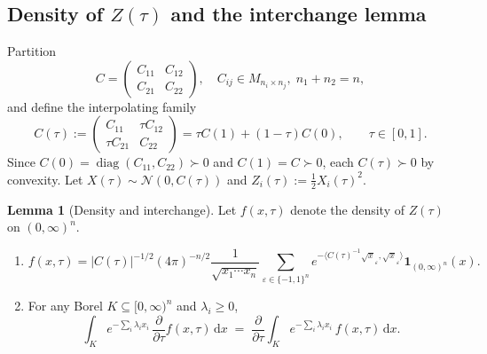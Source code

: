 \documentclass[14pt]{extarticle}
\theoremstyle{definition}
\newtheorem{lemma}[theorem]{Lemma}
\newcommand{\diag}{\operatorname{diag}}
\newcommand{\dd}{\mathrm{d}}
\newcommand{\ind}{\mathbf{1}}
\newcommand{\caln}{\mathcal{N}}
\begin{document}
\subsection{Density of $Z(\tau)$ and the interchange lemma}

Partition
\begin{equation}\label{eq:partition}
  C=\begin{pmatrix}C_{11}&C_{12}\\C_{21}&C_{22}\end{pmatrix},
  \quad C_{ij}\in M_{n_i\times n_j},\;n_1+n_2=n,
\end{equation}
and define the interpolating family
\begin{equation}\label{eq:Ctau}
  C(\tau):=\begin{pmatrix}C_{11}&\tau C_{12}\\
    \tau C_{21}&C_{22}\end{pmatrix}
  =\tau C(1)+(1-\tau)C(0),\qquad\tau\in[0,1].
\end{equation}
Since $C(0)=\diag(C_{11},C_{22})\succ 0$ and $C(1)=C\succ 0$, each
$C(\tau)\succ 0$ by convexity.  Let $X(\tau)\sim\caln(0,C(\tau))$ and
$Z_i(\tau):=\tfrac{1}{2}X_i(\tau)^2$.

\begin{lemma}[Density and interchange]\label{lem:diff}
  Let $f(x,\tau)$ denote the density of $Z(\tau)$ on $(0,\infty)^n$.
  \begin{enumerate}[label=(\roman*),nosep]
    \item
    \begin{equation}\label{eq:fxtau}
      f(x,\tau)
      =|C(\tau)|^{-1/2}(4\pi)^{-n/2}
      \frac{1}{\sqrt{x_1\cdots x_n}}
      \sum_{\varepsilon\in\{-1,1\}^n}
      e^{-\langle C(\tau)^{-1}\sqrt{x}_\varepsilon,
        \sqrt{x}_\varepsilon\rangle}
      \ind_{(0,\infty)^n}(x).
    \end{equation}
    \item For any Borel $K\subseteq[0,\infty)^n$ and
    $\lambda_i\geqslant 0$,
    \begin{equation}\label{eq:interchange}
      \int_K e^{-\sum_i\lambda_ix_i}\,
      \frac{\partial}{\partial\tau}f(x,\tau)\,\dd x
      \;=\;
      \frac{\partial}{\partial\tau}\int_K e^{-\sum_i\lambda_ix_i}\,
      f(x,\tau)\,\dd x.
    \end{equation}
  \end{enumerate}
\end{lemma}
\end{document}
